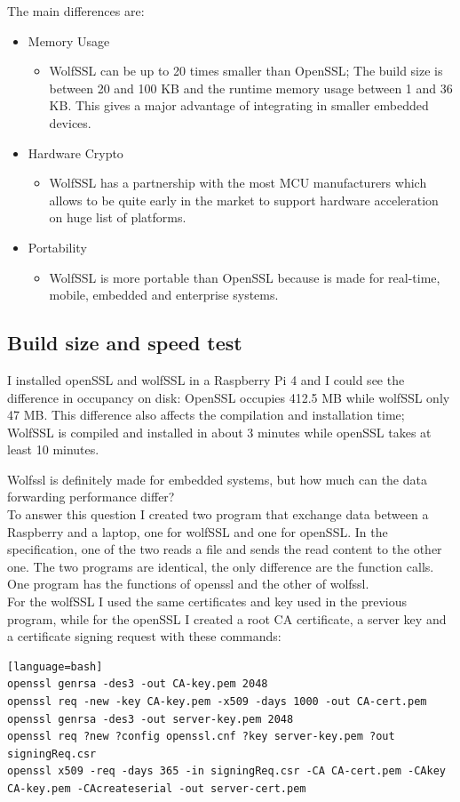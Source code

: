 \documentclass[a4paper,12pt]{article}
\begin{document}
The main differences are:
\begin{itemize}
\item Memory Usage
\begin{itemize}
\item WolfSSL can be up to 20 times smaller than OpenSSL; The build size is between 20 and 100 KB and the runtime memory usage between 1 and 36 KB. This gives a major advantage of integrating in smaller embedded devices. 
\end{itemize}
\item Hardware Crypto
\begin{itemize}
\item WolfSSL has a partnership with the most MCU manufacturers which allows to be quite early in the market to support hardware acceleration on huge list of platforms.
\end{itemize}
\item Portability
\begin{itemize}
\item WolfSSL is more portable than OpenSSL because is made for real-time, mobile, embedded and enterprise systems.
\end{itemize}
\end{itemize}

\subsection{Build size and speed test}
I installed openSSL and wolfSSL in a Raspberry Pi 4 and I could see the difference in occupancy on disk:
OpenSSL occupies 412.5 MB while wolfSSL only 47 MB. This difference also affects the compilation and installation time; WolfSSL is compiled and installed in about 3 minutes while openSSL takes at least 10 minutes.

Wolfssl is definitely made for embedded systems, but how much can the data forwarding performance differ?
\\To answer this question I created two program that exchange data between a Raspberry and a laptop, one for wolfSSL and one for openSSL. In the specification, one of the two reads a file and sends the read content to the other one.
The two programs are identical, the only difference are the function calls. One program has the functions of openssl and the other of wolfssl.
\\For the wolfSSL I used the same certificates and key used in the previous program, while for the openSSL I created a root CA certificate, a server key and a certificate signing request with these commands:
\begin{lstlisting}[caption={openSSL commands},captionpos=b][language=bash]
openssl genrsa -des3 -out CA-key.pem 2048
openssl req -new -key CA-key.pem -x509 -days 1000 -out CA-cert.pem
openssl genrsa -des3 -out server-key.pem 2048
openssl req ?new ?config openssl.cnf ?key server-key.pem ?out signingReq.csr
openssl x509 -req -days 365 -in signingReq.csr -CA CA-cert.pem -CAkey CA-key.pem -CAcreateserial -out server-cert.pem
\end{lstlisting}
\end{document}
